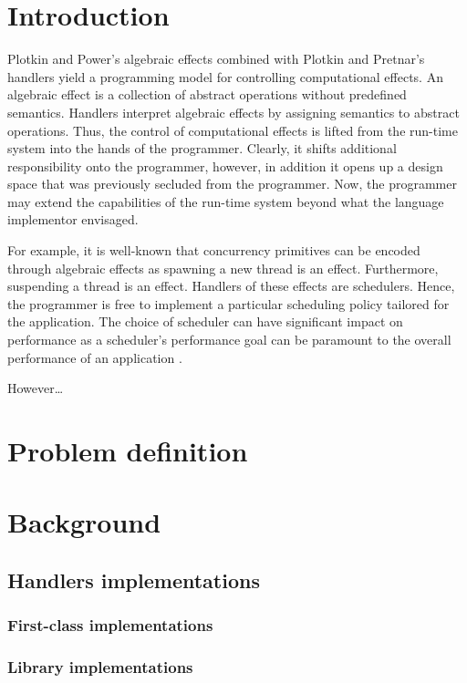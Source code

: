 \section{Introduction}
Plotkin and Power's algebraic effects \cite{Plotkin2001} combined with Plotkin and Pretnar's handlers \cite{Plotkin2013} yield a programming model for controlling computational effects. An algebraic effect is a collection of abstract operations without predefined semantics. Handlers interpret algebraic effects by assigning semantics to abstract operations. Thus, the control of computational effects is lifted from the run-time system into the hands of the programmer. Clearly, it shifts additional responsibility onto the programmer, however, in addition it opens up a design space that was previously secluded from the programmer. Now, the programmer may extend the capabilities of the run-time system beyond what the language implementor envisaged.

For example, it is well-known that concurrency primitives can be encoded through algebraic effects \cite{Bauer2015,Dolan2015} as spawning a new thread is an effect. Furthermore, suspending a thread is an effect. Handlers of these effects are schedulers. Hence, the programmer is free to implement a particular scheduling policy tailored for the application. The choice of scheduler can have significant impact on performance as a scheduler's performance goal can be paramount to the overall performance of an application \cite{Berman2003}.

However\dots

\section{Problem definition}

\section{Background}
\subsection{Handlers implementations}
\subsubsection{First-class implementations}
\subsubsection{Library implementations}

